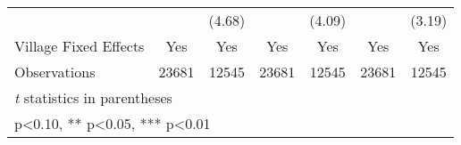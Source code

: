 \begin{table}[htbp]
\begin{tabular}{l*{6}{c}}
                &            &   (4.68)   &            &   (4.09)   &            &   (3.19)   \\
Village Fixed Effects&      Yes   &      Yes   &      Yes   &      Yes   &      Yes   &      Yes   \\
\midrule
Observations    &    23681   &    12545   &    23681   &    12545   &    23681   &    12545   \\
\bottomrule
\multicolumn{7}{l}{\footnotesize \textit{t} statistics in parentheses}\\
\multicolumn{7}{l}{\footnotesize * p<0.10, ** p<0.05, *** p<0.01}\\
\end{tabular}
\end{table}
